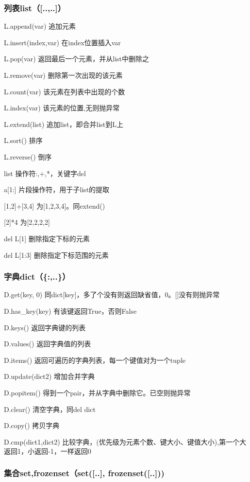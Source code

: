 \documentclass[5pt,a4paper,twocolumn]{article}
\begin{document}
\subsubsection*{列表list（[..,..]）}

L.append(var)   追加元素

L.insert(index,var) 在index位置插入var

L.pop(var)      返回最后一个元素，并从list中删除之

L.remove(var)   删除第一次出现的该元素

L.count(var)    该元素在列表中出现的个数

L.index(var)    该元素的位置,无则抛异常 

L.extend(list)  追加list，即合并list到L上

L.sort()        排序

L.reverse()     倒序

list 操作符:,+,*，关键字del

a[1:]       片段操作符，用于子list的提取

[1,2]+[3,4] 为[1,2,3,4]。同extend()

[2]*4       为[2,2,2,2]

del L[1]    删除指定下标的元素

del L[1:3]  删除指定下标范围的元素

\subsubsection*{字典dict（\{:,..\}）}

D.get(key, 0)       同dict[key]，多了个没有则返回缺省值，0。[]没有则抛异常

D.has\_key(key)      有该键返回True，否则False

D.keys()            返回字典键的列表

D.values() 返回字典值的列表

D.items() 返回可遍历的字典列表，每一个键值对为一个tuple

D.update(dict2)     增加合并字典

D.popitem()         得到一个pair，并从字典中删除它。已空则抛异常

D.clear()           清空字典，同del dict

D.copy()            拷贝字典

D.cmp(dict1,dict2)  比较字典，(优先级为元素个数、键大小、键值大小),第一个大返回1，小返回-1，一样返回0

\subsubsection*{集合set,frozenset（set([..], frozenset([..]))}
\end{document}
